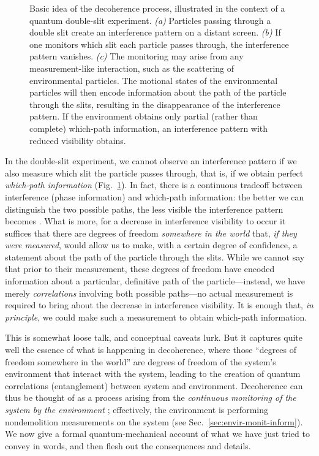 \documentclass[3p,sort&compress,12pt]{elsarticle}
\begin{document}
\begin{figure}
\caption{\label{fig:bi}Basic idea of the decoherence process, illustrated in the context of a quantum double-slit experiment. \emph{(a)} Particles passing through a double slit create an interference pattern on a distant screen. \emph{(b)} If one monitors which slit each particle passes through, the interference pattern vanishes. \emph{(c)} The monitoring may arise from any measurement-like interaction, such as the scattering of environmental particles. The motional states of the environmental particles will then encode information about the path of the particle through the slits, resulting in the disappearance of the interference pattern. If the environment obtains only partial (rather than complete) which-path information, an interference pattern with reduced visibility obtains.}
\end{figure}

In the double-slit experiment, we cannot observe an interference pattern if we also measure which slit the particle passes through, that is, if we obtain perfect \emph{which-path information} (Fig.~\ref{fig:bi}). In fact, there is a continuous tradeoff between interference (phase information) and which-path information: the better we can distinguish the two possible paths, the less visible the interference pattern becomes \cite{Wooters:1979:az,Englert:1996:km}. What is more, for a decrease in interference visibility to occur it suffices that there are degrees of freedom \emph{somewhere in the world} that, \emph{if they were measured}, would allow us to make, with a certain degree of confidence, a statement about the path of the particle through the slits. While we cannot say that prior to their measurement, these degrees of freedom have encoded information about a particular, definitive path of the particle---instead, we have merely \emph{correlations} involving both possible paths---no actual measurement is required to bring about the decrease in interference visibility. It is enough that, \emph{in principle}, we could make such a measurement to obtain which-path information. 

This is somewhat loose talk, and conceptual caveats lurk. But it captures quite well the essence of what is happening in decoherence, where those ``degrees of freedom somewhere in the world'' are degrees of freedom of the system's environment that interact with the system, leading to the creation of quantum correlations (entanglement) between system and environment. Decoherence can thus be thought of as a process arising from the \emph{continuous monitoring of the system by the environment} \cite{Zurek:1981:dd}; effectively, the environment is performing nondemolition measurements on the system (see Sec.~\ref{sec:envir-monit-inform}). We now give a formal quantum-mechanical account of what we have just tried to convey in words, and then flesh out the consequences and details.
\end{document}
